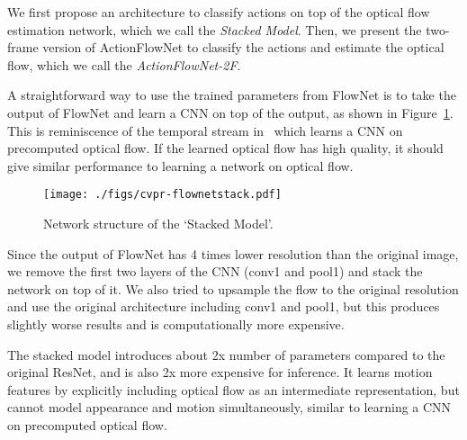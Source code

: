 \documentclass[10pt,twocolumn,letterpaper]{article}
\begin{document}
We first propose an architecture to classify actions on top of the optical flow estimation network, which we call the \emph{Stacked Model}.
Then, we present the two-frame version of ActionFlowNet to classify the actions and estimate the
optical flow, which we call the \emph{ActionFlowNet-2F}.

A straightforward way to use the trained parameters from FlowNet is to take the output of FlowNet and learn a CNN on top of the output, as shown in Figure~\ref{fig:stacked_archi}.
This is reminiscence of the temporal stream in~\cite{simonyanZ14a} which learns a CNN on precomputed optical flow.
If the learned optical flow has high quality, it should give similar performance to learning a network on optical flow.

\begin{figure}[h!]
\centering
	\texttt{[image: ./figs/cvpr-flownetstack.pdf]}	
  \caption{Network structure of the `Stacked Model'.}
	\label{fig:stacked_archi}
  \vspace{-.5em}
\end{figure}%

Since the output of FlowNet has 4 times lower resolution than the original image, we remove the first two layers of the CNN (conv1 and pool1) and stack the network on top of it.
We also tried to upsample the flow to the original resolution and use the original architecture including conv1 and pool1, but this produces slightly worse results and is computationally more expensive.

The stacked model introduces about 2x number of parameters compared to the original ResNet, and is also 2x more expensive for inference.
It learns motion features by explicitly including optical flow as an intermediate representation, but cannot model appearance and motion simultaneously, similar to learning a CNN on precomputed optical flow.
\end{document}
